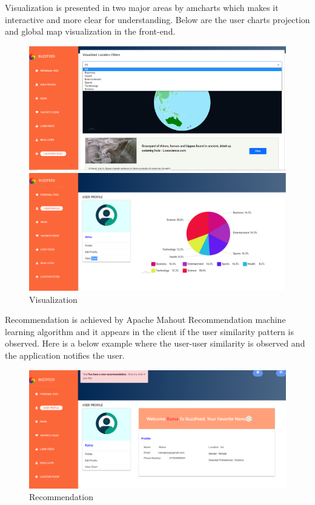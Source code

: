 Visualization is presented in two major areas by amcharts which makes it interactive and more clear for understanding.
Below are the user charts projection and global map visualization in the front-end.
\begin{figure}[h!]
    \begin{multicols}{2}
    \includegraphics[width=\linewidth]{images/Locationfilter.PNG}\par 
    \includegraphics[width=\linewidth]{images/userchart.PNG}\par 
    \end{multicols}

\centering \caption{Visualization}
\end{figure}

Recommendation is achieved by Apache Mahout Recommendation machine learning algorithm and it appears in the client if the user similarity pattern is observed.
Here is a below example where the user-user similarity is observed and the application notifies the user.\newline

\begin{figure}[h!]
    \begin{center}
    \includegraphics[width=\linewidth]{images/UserProfile_recommendation.PNG}\par
    \end{center}
\centering \caption{Recommendation}
\end{figure}


